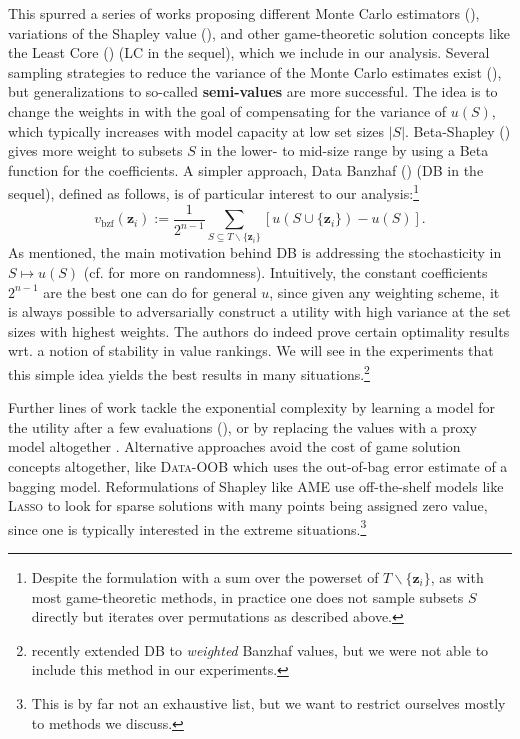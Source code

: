\documentclass[10pt]{article}
\newcommand{\assign}{:=}
\newcommand{\tmdfn}[1]{\textbf{#1}}
\newcommand{\tmem}[1]{{\em #1\/}}
\newcommand{\tmmathbf}[1]{\ensuremath{\boldsymbol{#1}}}
\newcommand{\tmname}[1]{\textsc{#1}}
\newcommand{\tmop}[1]{\ensuremath{\operatorname{#1}}}
\begin{document}
This spurred a series of works proposing different Monte Carlo estimators
({\cite{okhrati_multilinear_2021}}), variations of the Shapley value
({\cite{kwon_efficient_2021}}), and other game-theoretic solution concepts
like the Least Core ({\cite{yan_if_2021,benmerzoug_re_2023}}) (LC in the
sequel), which we include in our analysis. Several sampling strategies to
reduce the variance of the Monte Carlo estimates exist
({\cite{wu_variance_2023,covert_stochastic_2024}}), but generalizations to
so-called {\tmdfn{semi-values}} are more successful. The idea is to change the
weights in  with the goal of compensating for the
variance of $u (S)$, which typically increases with model capacity at low set
sizes $| S |$. Beta-Shapley ({\cite{kwon_beta_2022}}) gives more weight to
subsets $S$ in the lower- to mid-size range by using a Beta function for the
coefficients. A simpler approach, Data Banzhaf ({\cite{wang_data_2022}}) (DB
in the sequel), defined as follows, is of particular interest to our
analysis:\footnote{Despite the formulation with a sum over the powerset of
$T\backslash \{ \tmmathbf{z}_i \}$, as with most game-theoretic methods, in
practice one does not sample subsets $S$ directly but iterates over
permutations as described above.}
\begin{equation}
  v_{\tmop{bzf}} (\tmmathbf{z}_i) \assign \frac{1}{2^{n - 1}}  \sum_{S
  \subseteq T\backslash \{\tmmathbf{z}_i \}} [u (S \cup \{\tmmathbf{z}_i \}) -
  u (S)] . \label{eq:banzhaf-value}
\end{equation}
As mentioned, the main motivation behind DB is addressing the stochasticity in
$S \mapsto u (S)$ (cf.  for more on
randomness). Intuitively, the constant coefficients $2^{n - 1}$ are the best
one can do for general $u$, since given any weighting scheme, it is always
possible to adversarially construct a utility with high variance at the set
sizes with highest weights. The authors do indeed prove certain optimality
results wrt. a notion of stability in value rankings. We will see in the
experiments that this simple idea yields the best results in many
situations.\footnote{{\cite{li_robust_2023}} recently extended DB to
{\tmem{weighted}} Banzhaf values, but we were not able to include this method
in our experiments.}

Further lines of work tackle the exponential complexity by learning a model
for the utility after a few evaluations ({\cite{wang_improving_2022}}), or by
replacing the values with a proxy model altogether
{\cite{jia_scalability_2021}}. Alternative approaches avoid the cost of game
solution concepts altogether, like {\tmname{Data-OOB}}
{\cite{kwon_dataoob_2023}} which uses the out-of-bag error estimate of a
bagging model. Reformulations of Shapley like AME {\cite{lin_measuring_2022}}
use off-the-shelf models like {\tmname{Lasso}} to look for sparse solutions
with many points being assigned zero value, since one is typically interested
in the extreme situations.\footnote{This is by far not an exhaustive list, but
we want to restrict ourselves mostly to methods we discuss.}
\end{document}
